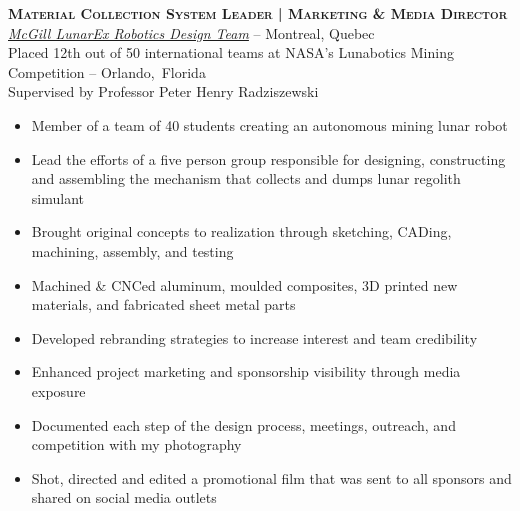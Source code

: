 \documentclass[11pt, letterpaper]{article} %
\newcommand{\years}[1]{\marginnote{\footnotesize #1}} %
\begin{document}
  \begin{samepage}
    \years{8/2012 - 8/2013} \textbf{\scshape Material Collection System Leader | Marketing \& Media Director}\\
    \href{http://www.lunarex.mcgill.ca}{\textit{McGill LunarEx Robotics Design Team}} -- Montreal, Quebec\\
    {\small Placed 12th out of 50 international teams at NASA's Lunabotics Mining Competition -- Orlando,~Florida\\ %
    Supervised by Professor Peter Henry Radziszewski}
      \begin{itemize}
        \item Member of a team of 40 students creating an autonomous mining lunar robot 
        \item Lead the efforts of a five person group responsible for designing, constructing and assembling the mechanism that collects and dumps lunar regolith simulant
        \item Brought original concepts to realization through sketching, CADing, machining, assembly, and testing
        \item Machined \& CNCed aluminum, moulded composites, 3D printed new materials, and fabricated sheet metal parts
        \item Developed rebranding strategies to increase interest and team credibility
        \item Enhanced project marketing and sponsorship visibility through media exposure
        \item Documented each step of the design process,  meetings, outreach, and competition with my photography
        \item Shot, directed and edited a promotional film that was sent to all sponsors and shared on social media outlets
      \end{itemize}
  \end {samepage}

\end{document}
